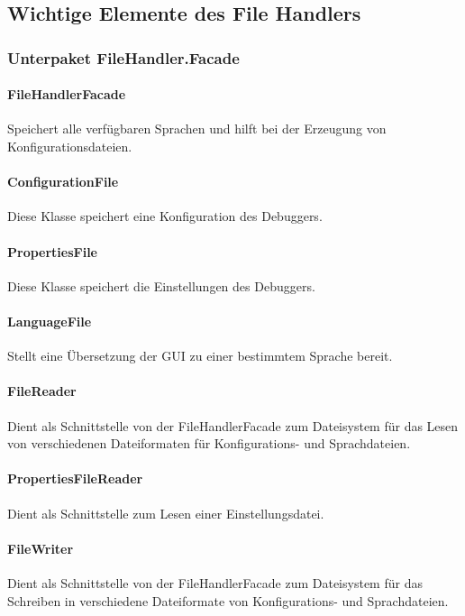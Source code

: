 \documentclass[parskip=full]{scrartcl}
\begin{document}
\subsection{Wichtige Elemente des File Handlers}
\subsubsection{Unterpaket FileHandler.Facade}
\paragraph{FileHandlerFacade}
Speichert alle verfügbaren Sprachen und hilft bei der Erzeugung von Konfigurationsdateien.
\paragraph{ConfigurationFile}
Diese Klasse speichert eine Konfiguration des Debuggers.
\paragraph{PropertiesFile}
Diese Klasse speichert die Einstellungen des Debuggers.
\paragraph{LanguageFile}
Stellt eine Übersetzung der GUI zu einer bestimmtem Sprache bereit.
\paragraph{FileReader}
Dient als Schnittstelle von der FileHandlerFacade zum Dateisystem für das Lesen von verschiedenen Dateiformaten für Konfigurations- und Sprachdateien.
\paragraph{PropertiesFileReader}
Dient als Schnittstelle zum Lesen einer Einstellungsdatei.
\paragraph{FileWriter}
Dient als Schnittstelle von der FileHandlerFacade zum Dateisystem für das Schreiben in verschiedene Dateiformate von Konfigurations- und Sprachdateien.
\end{document}
